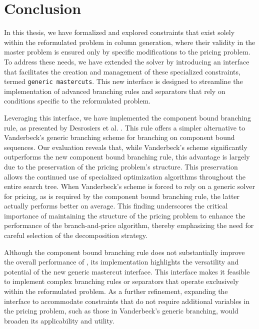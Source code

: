 \chapter{Conclusion}\label{ch:conclusion}
In this thesis, we have formalized and explored constraints that exist solely within the reformulated problem in column generation, where their validity in the master problem is ensured only by specific modifications to the pricing problem. To address these needs, we have extended the \GCG{} solver by introducing an interface that facilitates the creation and management of these specialized constraints, termed \texttt{generic mastercuts}. This new interface is designed to streamline the implementation of advanced branching rules and separators that rely on conditions specific to the reformulated problem.

Leveraging this interface, we have implemented the component bound branching rule, as presented by Desrosiers et al. \cite{thebook}. This rule offers a simpler alternative to Vanderbeck's generic branching scheme \cite{vanderbeck2011branching} for branching on component bound sequences. Our evaluation reveals that, while Vanderbeck's scheme significantly outperforms the new component bound branching rule, this advantage is largely due to the preservation of the pricing problem's structure. This preservation allows the continued use of specialized optimization algorithms throughout the entire search tree. When Vanderbeck's scheme is forced to rely on a generic \MIP{} solver for pricing, as is required by the component bound branching rule, the latter actually performs better on average. This finding underscores the critical importance of maintaining the structure of the pricing problem to enhance the performance of the branch-and-price algorithm, thereby emphasizing the need for careful selection of the decomposition strategy.

Although the component bound branching rule does not substantially improve the overall performance of \GCG{}, its implementation highlights the versatility and potential of the new generic mastercut interface. This interface makes it feasible to implement complex branching rules or separators that operate exclusively within the reformulated problem. As a further refinement, expanding the interface to accommodate constraints that do not require additional variables in the pricing problem, such as those in Vanderbeck's generic branching, would broaden its applicability and utility.

